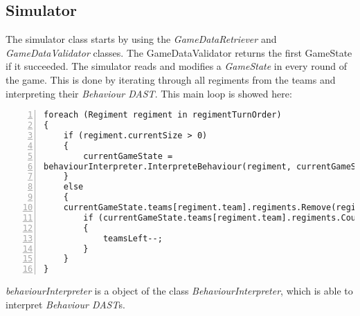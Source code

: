 \subsection{Simulator}
	The simulator class starts by using the {\it GameDataRetriever} and {\it GameDataValidator} classes. The GameDataValidator returns the first 
	GameState if it succeeded. The simulator reads and modifies a \textit{GameState} in every round of the game. This is done by iterating through all 
	regiments from the teams and interpreting their \textit{Behaviour DAST}. This main loop is showed here: \\
	\begin{lstlisting}[basicstyle=\small\sffamily,
		keywords={break,case,const,continue,default,else,enum,
		for,if,return,switch,while,do,long,void,int,float,double,
		char,struct,typedef,include,size\_t},
		keywordstyle={\color{blue}},
		comment={[l]{//}}, morecomment={[s]{/*}{*/}}, commentstyle=\itshape,
		columns={[l]flexible}, numbers=left, numberstyle=\tiny,
		frameround=fftt, frame=shadowbox, captionpos=b,
		caption={Main loop of the simulation},
		label=impl:regimentloop]
foreach (Regiment regiment in regimentTurnOrder)
{
	if (regiment.currentSize > 0)
	{
		currentGameState = 
behaviourInterpreter.InterpreteBehaviour(regiment, currentGameState);
	}
	else
	{
	currentGameState.teams[regiment.team].regiments.Remove(regiment);
		if (currentGameState.teams[regiment.team].regiments.Count <= 0)
		{
			teamsLeft--;
		}
	}
}
	\end{lstlisting}
	{\it behaviourInterpreter} is a object of the class {\it BehaviourInterpreter}, which is able to interpret \textit{Behaviour DAST}s.
	
